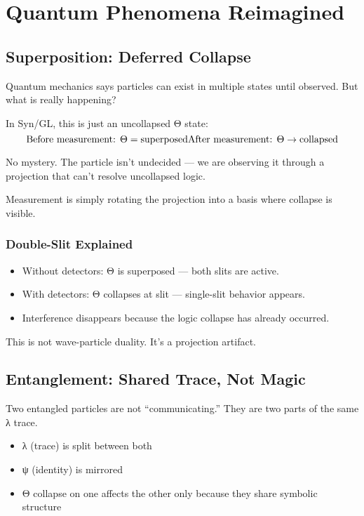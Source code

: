 
\chapter{Quantum Phenomena Reimagined}

\section{Superposition: Deferred Collapse}

Quantum mechanics says particles can exist in multiple states until observed. But what is really happening?

In Syn/GL, this is just an uncollapsed Θ state:
\[
\text{Before measurement: } \Theta = \text{superposed} \\
\text{After measurement: } \Theta \rightarrow \text{collapsed}
\]

No mystery. The particle isn't undecided — we are observing it through a projection that can't resolve uncollapsed logic.

Measurement is simply rotating the projection into a basis where collapse is visible.

\subsection*{Double-Slit Explained}

\begin{itemize}
\item Without detectors: Θ is superposed — both slits are active.
\item With detectors: Θ collapses at slit — single-slit behavior appears.
\item Interference disappears because the logic collapse has already occurred.
\end{itemize}

This is not wave-particle duality. It's a projection artifact.

\section{Entanglement: Shared Trace, Not Magic}

Two entangled particles are not “communicating.” They are two parts of the same λ trace.

\begin{itemize}
\item λ (trace) is split between both
\item ψ (identity) is mirrored
\item Θ collapse on one affects the other only because they share symbolic structure
\end{itemize}

